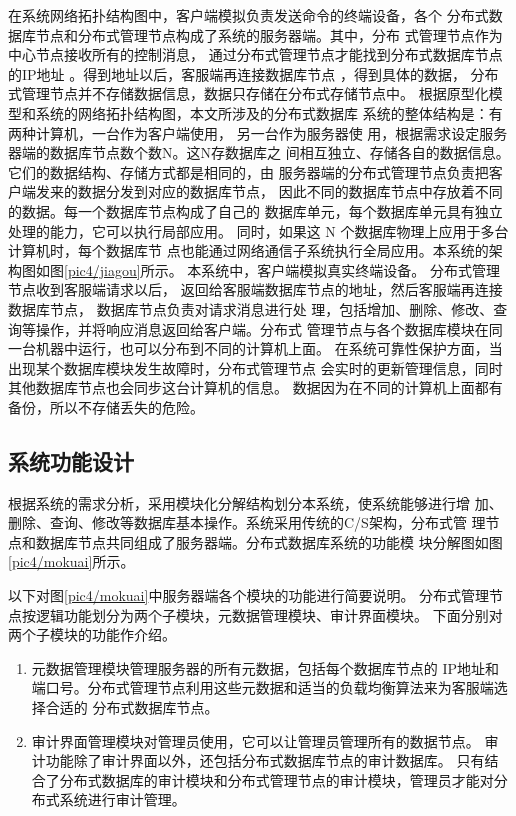 在系统网络拓扑结构图中，客户端模拟负责发送命令的终端设备，各个
分布式数据库节点和分布式管理节点构成了系统的服务器端。其中，分布
式管理节点作为中心节点接收所有的控制消息，
通过分布式管理节点才能找到分布式数据库节点的IP地址
。得到地址以后，客服端再连接数据库节点
，得到具体的数据，
分布式管理节点并不存储数据信息，数据只存储在分布式存储节点中。
根据原型化模型和系统的网络拓扑结构图，本文所涉及的分布式数据库
系统的整体结构是：有两种计算机，一台作为客户端使用，
另一台作为服务器使
用，根据需求设定服务器端的数据库节点数个数N。这N存数据库之
间相互独立、存储各自的数据信息。它们的数据结构、存储方式都是相同的，由
服务器端的分布式管理节点负责把客户端发来的数据分发到对应的数据库节点，
因此不同的数据库节点中存放着不同的数据。每一个数据库节点构成了自己的
数据库单元，每个数据库单元具有独立处理的能力，它可以执行局部应用。
同时，如果这 N 个数据库物理上应用于多台计算机时，每个数据库节
点也能通过网络通信子系统执行全局应用。本系统的架构图如图\ref{pic4/jiagou}所示。
本系统中，客户端模拟真实终端设备。
分布式管理节点收到客服端请求以后，
返回给客服端数据库节点的地址，然后客服端再连接数据库节点，
数据库节点负责对请求消息进行处
理，包括增加、删除、修改、查询等操作，并将响应消息返回给客户端。分布式
管理节点与各个数据库模块在同一台机器中运行，也可以分布到不同的计算机上面。
在系统可靠性保护方面，当出现某个数据库模块发生故障时，分布式管理节点
会实时的更新管理信息，同时其他数据库节点也会同步这台计算机的信息。
数据因为在不同的计算机上面都有备份，所以不存储丢失的危险。
\subsection{系统功能设计}
根据系统的需求分析，采用模块化分解结构划分本系统，使系统能够进行增
加、删除、查询、修改等数据库基本操作。系统采用传统的C/S架构，分布式管
理节点和数据库节点共同组成了服务器端。分布式数据库系统的功能模
块分解图如图\ref{pic4/mokuai}所示。

以下对图\ref{pic4/mokuai}中服务器端各个模块的功能进行简要说明。
分布式管理节点按逻辑功能划分为两个子模块，元数据管理模块、审计界面模块。
下面分别对两个子模块的功能作介绍。
\begin{enumerate}
	\item 元数据管理模块管理服务器的所有元数据，包括每个数据库节点的
	IP地址和端口号。分布式管理节点利用这些元数据和适当的负载均衡算法来为客服端选择合适的
	分布式数据库节点。
	\item 审计界面管理模块对管理员使用，它可以让管理员管理所有的数据节点。
	审计功能除了审计界面以外，还包括分布式数据库节点的审计数据库。
	只有结合了分布式数据库的审计模块和分布式管理节点的审计模块，管理员才能对分布式系统进行审计管理。
\end{enumerate}

